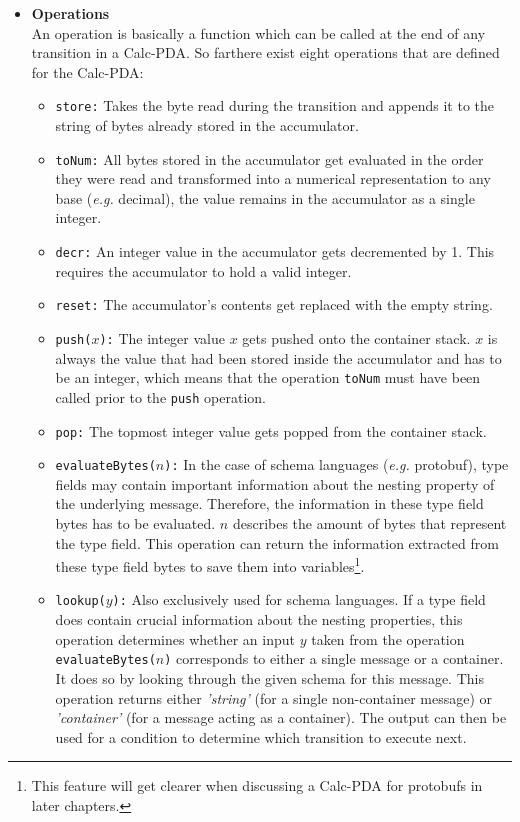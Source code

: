 \begin{itemize}
    \item \textbf{Operations}\\An operation is basically a function which can be called at the end of any transition in a Calc-PDA. So far\footnotemark[6] there exist eight operations that are defined for the Calc-PDA:\\
    \begin{itemize}
        \item \texttt{store:} Takes the byte read during the transition and appends it to the string of bytes already stored in the accumulator.
        \item \texttt{toNum:} All bytes stored in the accumulator get evaluated in the order they were read and transformed into a numerical representation to any base (\textit{e.g.} decimal), the value remains in the accumulator as a single integer.
        \item \texttt{decr:} An integer value in the accumulator gets decremented by 1. This requires the accumulator to hold a valid integer.
        \item \texttt{reset:} The accumulator's contents get replaced with the empty string.
        \item \texttt{push($x$):} The integer value $x$ gets pushed onto the container stack. $x$ is always the value that had been stored inside the accumulator and has to be an integer, which means that the operation \texttt{toNum} must have been called prior to the \texttt{push} operation.
        \item \texttt{pop:} The topmost integer value gets popped from the container stack.
        \item \texttt{evaluateBytes($n$):} In the case of schema languages (\textit{e.g.} protobuf), type fields may contain important information about the nesting property of the underlying message. Therefore, the information in these type field bytes has to be evaluated. $n$ describes the amount of bytes that represent the type field. This operation can return the information extracted from these type field bytes to save them into variables\footnote{This feature will get clearer when discussing a Calc-PDA for protobufs in later chapters.}.
        \item \texttt{lookup($y$):} Also exclusively used for schema languages. If a type field does contain crucial information about the nesting properties, this operation determines whether an input $y$ taken from the operation \texttt{evaluateBytes($n$)} corresponds to either a single message or a container. It does so by looking through the given schema for this message. This operation returns either \textit{'string'} (for a single non-container message) or \textit{'container'} (for a message acting as a container). The output can then be used for a condition to determine which transition to execute next\footnotemark[7].
    \end{itemize}
\end{itemize}
